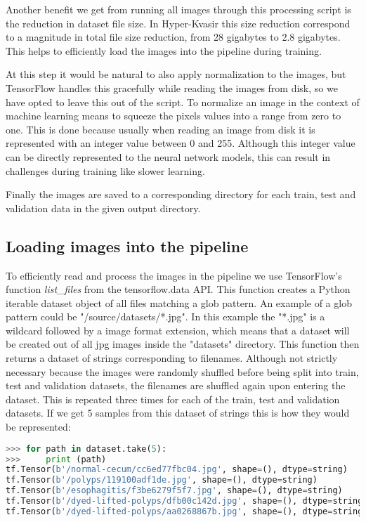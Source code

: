 \documentclass[thesis.tex]{subfiles}
\begin{document}
Another benefit we get from running all images through this processing script is the reduction in dataset file size. In Hyper-Kvasir this size reduction correspond to a magnitude in total file size reduction, from 28 gigabytes to 2.8 gigabytes. This helps to efficiently load the images into the pipeline during training.

At this step it would be natural to also apply normalization to the images, but TensorFlow handles this gracefully while reading the images from disk, so we have opted to leave this out of the script. To normalize an image in the context of machine learning means to squeeze the pixels values into a range from zero to one. This is done because usually when reading an image from disk it is represented with an integer value between 0 and 255. Although this integer value can be directly represented to the neural network models, this can result in challenges during training like slower learning.

Finally the images are saved to a corresponding directory for each train, test and validation data in the given output directory.


\subsection{Loading images into the pipeline}
To efficiently read and process the images in the pipeline we use TensorFlow's function \textit{list\_files} from the tensorflow.data API. This function creates a Python iterable dataset object of all files matching a glob pattern. An example of a glob pattern could be "/source/datasets/*.jpg". In this example the "*.jpg" is a wildcard followed by a image format extension, which means that a dataset will be created out of all jpg images inside the "datasets" directory. This function then returns a dataset of strings corresponding to filenames. Although not strictly necessary because the images were randomly shuffled before being split into train, test and validation datasets, the filenames are shuffled again upon entering the dataset. This is repeated three times for each of the train, test and validation datasets. If we get 5 samples from this dataset of strings this is how they would be represented:

\begin{lstlisting}[language=Python]
>>> for path in dataset.take(5):
>>> 	print (path)
tf.Tensor(b'/normal-cecum/cc6ed77fbc04.jpg', shape=(), dtype=string)
tf.Tensor(b'/polyps/119100adf1de.jpg', shape=(), dtype=string)
tf.Tensor(b'/esophagitis/f3be6279f5f7.jpg', shape=(), dtype=string)
tf.Tensor(b'/dyed-lifted-polyps/dfb00c142d.jpg', shape=(), dtype=string)
tf.Tensor(b'/dyed-lifted-polyps/aa0268867b.jpg', shape=(), dtype=string)
\end{lstlisting}
\end{document}
